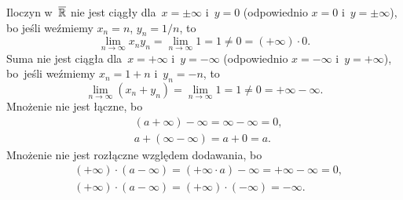 \documentclass[a4paper,11pt]{article}
\begin{document}
\vspace{\spaceFour}



\start {} Iloczyn w~$\overline{ \mathbb{R} }$ nie jest ciągły
dla~$x = \pm \infty$ i~$y = 0$ (odpowiednio $x = 0$
i~$y = \pm \infty$), bo jeśli weźmiemy $x_{ n } = n$, $y_{ n } = 1 / n$,
to
\begin{equation}
  \label{eq:LojasiewiczWDTFRz-02}
  \lim\limits_{ n \to \infty } x_{ n } y_{ n }
  = \lim\limits_{ n \to \infty } 1 = 1 \neq 0 = ( +\infty ) \cdot 0.
\end{equation}
Suma nie jest ciągła dla~$x = +\infty$ i~$y = -\infty$ (odpowiednio
$x = -\infty$ i~$y = +\infty$), bo~jeśli weźmiemy $x_{ n } = 1 + n$
i~$y_{ n } = -n$, to
\begin{equation}
  \label{eq:LojasiewiczWDTFRz-03}
  \lim\limits_{ n \to \infty } ( x_{ n } + y_{ n } )
  = \lim\limits_{ n \to \infty } 1 = 1 \neq 0 = +\infty - \infty.
\end{equation}
Mnożenie nie jest łączne, bo
\begin{equation}
  \label{eq:LojasiewiczWDTFRz-04}
  \begin{split}
    &( a + \infty ) - \infty = \infty - \infty = 0, \\
    &a + ( \infty - \infty ) = a + 0 = a.
  \end{split}
\end{equation}
Mnożenie nie jest rozłączne względem dodawania, bo
\begin{equation}
  \label{eq:LojasiewiczWDTFRz-05}
  \begin{split}
    &( +\infty ) \cdot ( a - \infty ) = ( +\infty \cdot a ) - \infty
    = +\infty - \infty = 0, \\
    &( +\infty ) \cdot ( a - \infty ) = ( +\infty ) \cdot ( -\infty )
    = -\infty.
  \end{split}
\end{equation}

\vspace{\spaceFour}
\end{document}

